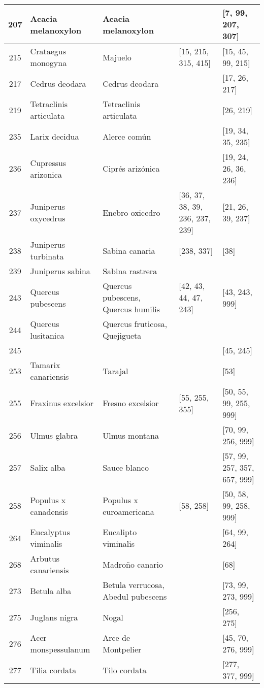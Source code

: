 \begin{landscape}
\begin{longtable}{|c|p{4cm}|p{4cm}|p{4cm}|p{4cm}|}
\hline
207 & Acacia melanoxylon & Acacia melanoxylon &  & [7, 99, 207, 307] \\
\hline
215 & Crataegus monogyna & Majuelo & [15, 215, 315, 415] & [15, 45, 99, 215] \\
\hline
217 & Cedrus deodara & Cedrus deodara &  & [17, 26, 217] \\
\hline
219 & Tetraclinis articulata & Tetraclinis articulata &  & [26, 219] \\
\hline
235 & Larix decidua & Alerce común &  & [19, 34, 35, 235] \\
\hline
236 & Cupressus arizonica & Ciprés arizónica &  & [19, 24, 26, 36, 236] \\
\hline
237 & Juniperus oxycedrus & Enebro oxicedro & [36, 37, 38, 39, 236, 237, 239] & [21, 26, 39, 237] \\
\hline
238 & Juniperus turbinata & Sabina canaria & [238, 337] & [38] \\
\hline
239 & Juniperus sabina & Sabina rastrera &  &  \\
\hline
243 & Quercus pubescens & Quercus pubescens, Quercus humilis & [42, 43, 44, 47, 243] & [43, 243, 999] \\
\hline
244 & Quercus lusitanica & Quercus fruticosa, Quejigueta &  &  \\
\hline
245 &  &  &  & [45, 245] \\
\hline
253 & Tamarix canariensis & Tarajal &  & [53] \\
\hline
255 & Fraxinus excelsior & Fresno excelsior & [55, 255, 355] & [50, 55, 99, 255, 999] \\
\hline
256 & Ulmus glabra & Ulmus montana &  & [70, 99, 256, 999] \\
\hline
257 & Salix alba & Sauce blanco &  & [57, 99, 257, 357, 657, 999] \\
\hline
258 & Populus x canadensis & Populus x euroamericana & [58, 258] & [50, 58, 99, 258, 999] \\
\hline
264 & Eucalyptus viminalis & Eucalipto viminalis &  & [64, 99, 264] \\
\hline
268 & Arbutus canariensis & Madroño canario &  & [68] \\
\hline
273 & Betula alba & Betula verrucosa, Abedul pubescens &  & [73, 99, 273, 999] \\
\hline
275 & Juglans nigra & Nogal &  & [256, 275] \\
\hline
276 & Acer monspessulanum & Arce de Montpelier &  & [45, 70, 276, 999] \\
\hline
277 & Tilia cordata & Tilo cordata &  & [277, 377, 999] \\

\end{longtable}
\end{landscape}
